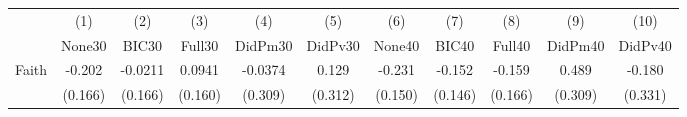 {
\def\sym#1{\ifmmode^{#1}\else\(^{#1}\)\fi}
\begin{tabular}{l*{10}{c}}
\toprule
            &\multicolumn{1}{c}{(1)}&\multicolumn{1}{c}{(2)}&\multicolumn{1}{c}{(3)}&\multicolumn{1}{c}{(4)}&\multicolumn{1}{c}{(5)}&\multicolumn{1}{c}{(6)}&\multicolumn{1}{c}{(7)}&\multicolumn{1}{c}{(8)}&\multicolumn{1}{c}{(9)}&\multicolumn{1}{c}{(10)}\\
            &\multicolumn{1}{c}{None30}&\multicolumn{1}{c}{BIC30}&\multicolumn{1}{c}{Full30}&\multicolumn{1}{c}{DidPm30}&\multicolumn{1}{c}{DidPv30}&\multicolumn{1}{c}{None40}&\multicolumn{1}{c}{BIC40}&\multicolumn{1}{c}{Full40}&\multicolumn{1}{c}{DidPm40}&\multicolumn{1}{c}{DidPv40}\\
\midrule
Faith       &      -0.202         &     -0.0211         &      0.0941         &     -0.0374         &       0.129         &      -0.231         &      -0.152         &      -0.159         &       0.489         &      -0.180         \\
            &     (0.166)         &     (0.166)         &     (0.160)         &     (0.309)         &     (0.312)         &     (0.150)         &     (0.146)         &     (0.166)         &     (0.309)         &     (0.331)         \\
\bottomrule
\end{tabular}
}
